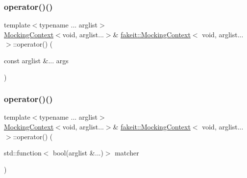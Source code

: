 \subsubsection{\texorpdfstring{operator()()}{operator()()}\hspace{0.1cm}{\footnotesize\ttfamily [6/18]}}
{\footnotesize\ttfamily template$<$typename ... arglist$>$ \\
\mbox{\hyperlink{classfakeit_1_1MockingContext}{Mocking\+Context}}$<$void, arglist...$>$\& \mbox{\hyperlink{classfakeit_1_1MockingContext}{fakeit\+::\+Mocking\+Context}}$<$ void, arglist... $>$\+::operator() (\begin{DoxyParamCaption}\item[{const arglist \&...}]{args }\end{DoxyParamCaption})\hspace{0.3cm}{\ttfamily [inline]}}

\mbox{\label{classfakeit_1_1MockingContext_3_01void_00_01arglist_8_8_8_01_4_a1a5a55569a763877d395635979e6b3d6}} 
\subsubsection{\texorpdfstring{operator()()}{operator()()}\hspace{0.1cm}{\footnotesize\ttfamily [7/18]}}
{\footnotesize\ttfamily template$<$typename ... arglist$>$ \\
\mbox{\hyperlink{classfakeit_1_1MockingContext}{Mocking\+Context}}$<$void, arglist...$>$\& \mbox{\hyperlink{classfakeit_1_1MockingContext}{fakeit\+::\+Mocking\+Context}}$<$ void, arglist... $>$\+::operator() (\begin{DoxyParamCaption}\item[{std\+::function$<$ bool(arglist \&...)$>$}]{matcher }\end{DoxyParamCaption})\hspace{0.3cm}{\ttfamily [inline]}}

\mbox{\label{classfakeit_1_1MockingContext_3_01void_00_01arglist_8_8_8_01_4_a1a5a55569a763877d395635979e6b3d6}} 
